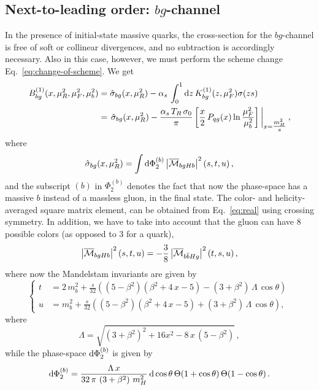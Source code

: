 \subsection{Next-to-leading order: $bg$-channel}
In the presence of initial-state massive quarks, the cross-section for
the $bg$-channel is free of  soft or 
collinear divergences, and no subtraction is accordingly
necessary. Also in this case, however, we must  perform the scheme
change Eq.~\eqref{eq:change-of-scheme}. We get
\begin{equation}
  \begin{split}
    B_{bg}^{(1)}(x,\mu_R^2,\mu_F^2,\mu_b^2) & = \hat{\sigma}_{bg}(x,\mu_R^2)
    - \alpha_s\,\int_0^1{\rm d}z\, K_{bg}^{(1)}(z,\mu_F^2)\sigma(zs)\,\\
    & = \left. \hat{\sigma}_{bg}(x,\mu_R^2) - \frac{\alpha_s\,
        T_R\,\sigma_0}{\pi}\left[ \frac{x}{2}\,P_{qg}(x)
        \ln{\frac{\mu_F^2}{\mu_b^2}}\right]\,\right|_{x=\tfrac{m_H^2}{s}},
  \end{split}
\end{equation}
where
\begin{equation}
  \hat{\sigma}_{bg}(x,\mu_R^2) = \int{\rm d}\Phi_2^{(b)}
  \left| \overline{{\cal M}}_{bgHb} \right|^2(s,t,u)\,,
\end{equation}
and the subscript $(b)$ in $\Phi_2^{(b)}$ denotes the fact that now
the phase-space has a massive $b$ instead of a massless gluon, in the
final state. The color- and helicity-averaged square matrix element,
can be obtained from Eq.~\eqref{eq:real} using crossing symmetry. In
addition, we have to take into account that the gluon can have 8
possible colors (as opposed to 3 for a quark),
\begin{equation}
  \left| \overline{{\cal M}}_{bgHb} \right|^2(s,t,u)=
  - \frac{3}{8} \left| \overline{{\cal M}}_{b\bar{b}Hg} \right|^2(t,s,u)\,,
\end{equation}
where now the Mandelstam invariants are given by
\begin{equation}
  \left\{
    \begin{split}
      t &= 2\,m_b^2 +
      \frac{s}{32}\left((5-\beta^2)(\beta^2+4\,x-5) -
        (3+\beta^2)\,\Lambda\,\cos\theta\right)\\
      u &= m_b^2 +\frac{s}{32}\left((5-\beta^2)(\beta^2+4\,x-5) +
        (3+\beta^2)\,\Lambda\,\cos\theta\right), 
    \end{split}
  \right.\,
\end{equation}
where
\begin{equation}
  \Lambda = \sqrt{\left( 3+\beta^2 \right)^2 + 16 x^2 -
    8\,x\,\left(5-\beta^2\right)}\,,
\end{equation}
while the phase-space ${\rm d}\Phi_2^{(b)}$ is given by
\begin{equation}
  {\rm d}\Phi_2^{(b)} = \frac{\Lambda\,x}{32\,\pi\,\left( 3+\beta^2
    \right)\,m_H^2}\,{\rm d}\cos\theta\,
  \Theta(1+\cos\theta )\,\Theta(1-\cos\theta)\,.
\end{equation}

